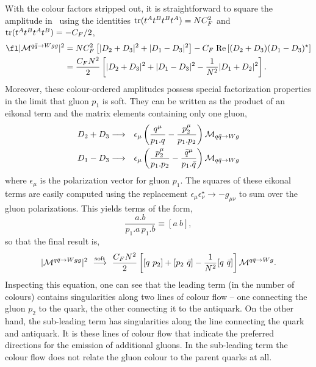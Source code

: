 \documentclass[12pt]{iopart}
\begin{document}
With the colour factors stripped out, it is
straightforward to square the amplitude in~ using the
identities ${\rm tr}(t^At^Bt^Bt^A)=N C_F^2$ and ${\rm tr}(t^At^Bt^At^B)=-C_F/2$,
\begin{eqnarray}
\fl
|{\cal M}^{q{\bar q} \to Wgg}|^2 &= NC_F^2 \left[ |D_2+D_3|^2 + |D_1-D_3|^2 \right]
 - C_F \; {\rm Re} \left[ (D_2+D_3)(D_1-D_3)^\star \right] \nonumber \\
 &= \frac{C_F N^2}{2} \left[ |D_2+D_3|^2 + |D_1-D_3|^2
     - \frac{1}{N^2} |D_1+D_2|^2 \right].
\label{eq:colstrucsq}
\end{eqnarray}
Moreover, these colour-ordered amplitudes possess special factorization properties in the
limit that gluon $p_1$ is soft. They can be written as the
product of an eikonal term and the matrix elements containing only one gluon,
\begin{eqnarray}
D_2+D_3 &\longrightarrow& \epsilon_\mu
 \left( \frac{q^\mu}{p_1.q}-\frac{p_2^\mu}{p_1.p_2} \right) {\cal M}_{q{\bar q} \to Wg}
 \nonumber \\
D_1-D_3 &\longrightarrow& \epsilon_\mu
 \left( \frac{p_2^\mu}{p_1.p_2}-\frac{{\bar q}^\mu}{p_1.{\bar q}} \right) {\cal M}_{q{\bar q} \to Wg}
\label{eq:eikonal}
\end{eqnarray}
where $\epsilon_\mu$ is the polarization vector for gluon $p_1$.
The squares of these eikonal terms are easily computed using
the replacement $\epsilon_\mu \epsilon_\nu^\star \to -g_{\mu\nu}$ to sum over the gluon
polarizations. This yields terms of the form,
\begin{equation}
\frac{a.b}{p_1.a \, p_1.b} \equiv [a~b],
\label{eq:eikonalsq}
\end{equation}
so that the final result is,
\begin{equation}
|{\cal M}^{q{\bar q} \to Wgg}|^2 \stackrel{{\rm soft}}{~\longrightarrow~}
   \frac{C_F N^2}{2} \left[ [q~p_2] + [p_2~{\bar q}]
     - \frac{1}{N^2} [q~{\bar q}] \right] {\cal M}^{q{\bar q} \to Wg}.
\end{equation}
Inspecting this equation, one can see that the leading term (in the number of colours)
contains singularities along two lines of colour flow -- one connecting the gluon $p_2$ to the
quark, the other connecting it to the antiquark. On the other hand, the sub-leading term has
singularities along the line connecting the quark and antiquark. It is these lines of colour
flow that indicate the preferred directions for the emission of additional gluons. In the
sub-leading term the colour flow does not relate the gluon colour to the parent quarks at all.
\end{document}
